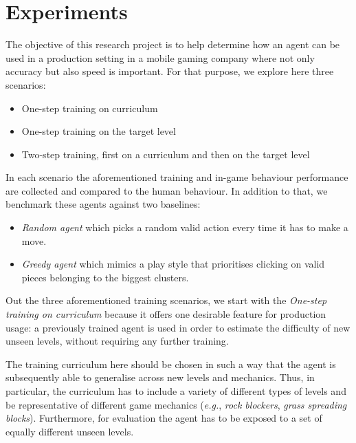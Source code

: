 \documentclass[conference]{IEEEtran}
\begin{document}
\section{Experiments}

The objective of this research project is to help determine how an agent can be used in a production setting in a mobile gaming company where not only accuracy but also speed is important. For that purpose, we explore here three scenarios:

\begin{itemize}
    \item One-step training on curriculum
    \item One-step training on the target level
    \item Two-step training, first on a curriculum and then on the target level
\end{itemize}
In each scenario the aforementioned training and in-game behaviour performance are collected and compared to the human behaviour. In addition to that, we benchmark these agents against two baselines:
\begin{itemize}
    \item \emph{Random agent} which picks a random valid action every time it has to make a move.
    \item \emph{Greedy agent} which mimics a play style that prioritises clicking on valid pieces belonging to the biggest clusters.
\end{itemize}

Out the three aforementioned training scenarios, we start with the \emph{One-step training on curriculum} because it offers one desirable feature for production usage: a previously trained agent is used in order to estimate the difficulty of new unseen levels, without requiring any further training.

The training curriculum here should be chosen in such a way that the agent is subsequently able to generalise across new levels and mechanics. Thus, in particular, the curriculum has to include a variety of different types of levels and be representative of different game mechanics (\emph{e.g.}, \emph{rock blockers}, \emph{grass spreading blocks}). Furthermore, for evaluation the agent has to be exposed to a set of equally different unseen levels.
\end{document}
